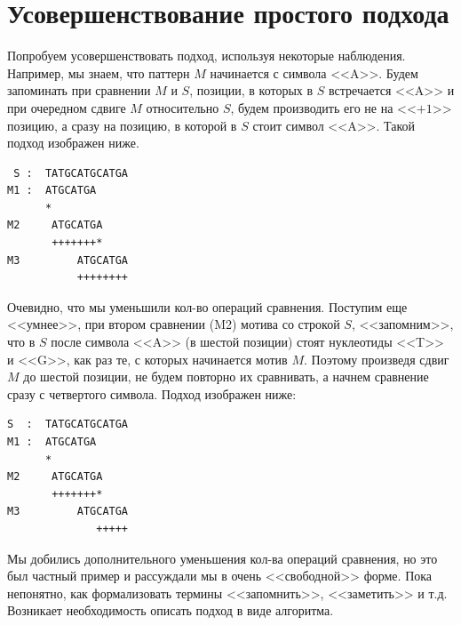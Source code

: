 \documentclass[letterpaper, 11pt]{article}
\begin{document}
\section{Усовершенствование простого подхода}
\par
Попробуем усовершенствовать подход, используя некоторые наблюдения. Например, мы знаем, что паттерн $M$ начинается с символа <<A>>. Будем запоминать при сравнении $M$ и $S$, позиции, в которых в $S$ встречается <<A>> и при очередном сдвиге $M$ относительно $S$, будем производить его не на <<$+1$>> позицию, а сразу на позицию, в которой в $S$ стоит символ <<A>>. Такой подход изображен ниже.
\begin{verbatim}
 S :  TATGCATGCATGA
M1 :  ATGCATGA
      * 
M2     ATGCATGA
       +++++++*
M3         ATGCATGA
           ++++++++
\end{verbatim}
\par
Очевидно, что мы уменьшили кол-во операций сравнения. Поступим еще <<умнее>>, при втором сравнении (M2) мотива со строкой $S$, <<запомним>>, что в $S$ после символа <<A>> (в шестой позиции) стоят нуклеотиды <<T>> и <<G>>, как раз те, с которых начинается мотив $M$. Поэтому произведя сдвиг $M$ до шестой позиции, не будем повторно их сравнивать, а начнем сравнение сразу с четвертого символа. Подход изображен ниже:
\begin{verbatim}
S  :  TATGCATGCATGA
M1 :  ATGCATGA
      * 
M2     ATGCATGA
       +++++++*
M3         ATGCATGA
              +++++
\end{verbatim}
\par
Мы добились дополнительного уменьшения кол-ва операций сравнения, но это был частный пример и рассуждали мы в очень <<свободной>> форме. Пока непонятно, как формализовать термины <<запомнить>>, <<заметить>> и т.д. Возникает необходимость описать подход в виде алгоритма.
\end{document}
